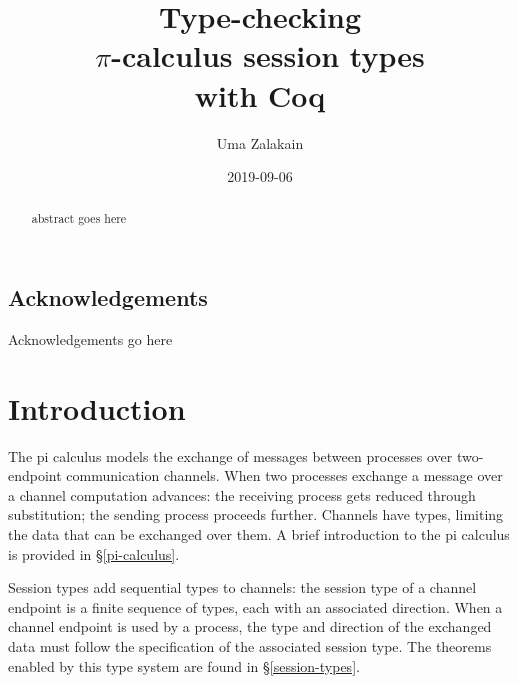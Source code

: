 \documentclass{mproj}
\begin{document}
\title{Type-checking\\ $\pi$-calculus session types\\ with Coq}
\author{Uma Zalakain}
\date{2019-09-06}
\maketitle

\begin{abstract}
abstract goes here
\end{abstract}

\educationalconsent
\vfill{}
\doclicenseThis
\newpage

\section*{Acknowledgements}

Acknowledgements go here

\tableofcontents

\chapter{Introduction}\label{intro}

The pi calculus models the exchange of messages between processes over
two-endpoint communication channels. When two processes exchange a message over
a channel computation advances: the receiving process gets reduced through
substitution; the sending process proceeds further. Channels have types,
limiting the data that can be exchanged over them. A brief introduction to the
pi calculus is provided in \S \ref{pi-calculus}.

Session types add sequential types to channels: the session type of a channel
endpoint is a finite sequence of types, each with an associated direction.  When
a channel endpoint is used by a process, the type and direction of the exchanged
data must follow the specification of the associated session type. The theorems
enabled by this type system are found in \S \ref{session-types}.
\end{document}
